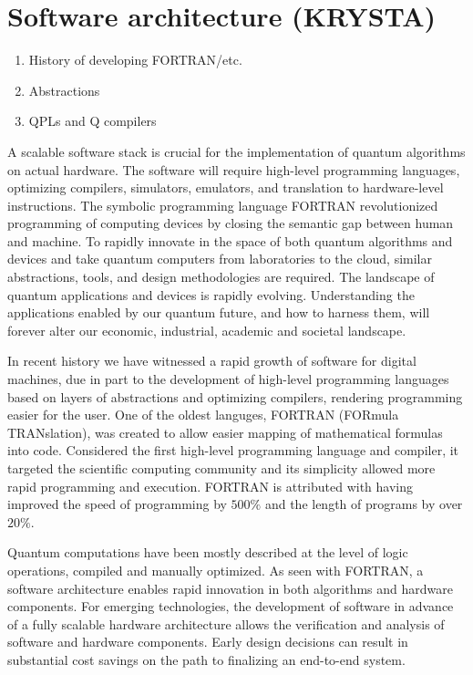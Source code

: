 \documentclass[journal]{IEEEtran}
\begin{document}
\section{Software architecture (KRYSTA)}


\begin{enumerate}
\item     History of developing FORTRAN/etc.
\item     Abstractions
\item    QPLs and Q compilers
\end{enumerate}

A scalable software stack is crucial for the implementation of quantum algorithms on actual hardware.  The software will require high-level programming languages, optimizing compilers, simulators, emulators, and translation to hardware-level instructions.  The symbolic programming language FORTRAN revolutionized programming of computing devices by closing the semantic gap between human and machine.  To rapidly innovate in the space of both quantum algorithms and devices and take quantum computers from laboratories to the cloud, similar abstractions, tools, and design methodologies are required.  The landscape of quantum applications and devices is rapidly evolving.  Understanding the applications enabled by our quantum future, and how to harness them, will forever alter our economic, industrial, academic and societal landscape.

In recent history we have witnessed a rapid growth of software for digital machines, due in part to the development of high-level programming languages based on layers of abstractions and optimizing compilers, rendering programming easier for the user.
One of the oldest languges, FORTRAN \cite{} (FORmula TRANslation), was created to allow easier mapping of mathematical formulas into code.  Considered the first high-level programming language and compiler, it targeted the scientific computing community and its simplicity allowed more rapid programming and execution.  FORTRAN is attributed with having improved the speed of programming by $500\%$ and the length of programs by over $20\%$.

Quantum computations have been mostly described at the level of logic operations, compiled and manually optimized. 
As seen with FORTRAN, a software architecture enables rapid innovation in both algorithms and hardware components.
For emerging technologies, the development of software in advance of a fully scalable hardware architecture allows the verification and analysis of software and hardware components.  Early design decisions can result in substantial cost savings on the path to finalizing an end-to-end system.
\end{document}

